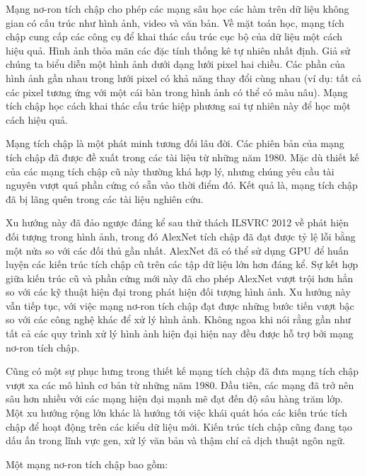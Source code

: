 \documentclass[../main.tex]{subfiles}
\begin{document}
Mạng nơ-ron tích chập cho phép các mạng sâu học các hàm trên dữ liệu không gian có cấu trúc như hình ảnh, video và văn bản. Về mặt toán học, mạng tích chập cung cấp các công cụ để khai thác cấu trúc cục bộ của dữ liệu một cách hiệu quả. Hình ảnh thỏa mãn các đặc tính thống kê tự nhiên nhất định. Giả sử chúng ta biểu diễn một hình ảnh dưới dạng lưới pixel hai chiều. Các phần của hình ảnh gần nhau trong lưới pixel có khả năng thay đổi cùng nhau (ví dụ: tất cả các pixel tương ứng với một cái bàn trong hình ảnh có thể có màu nâu). Mạng tích chập học cách khai thác cấu trúc hiệp phương sai tự nhiên này để học một cách hiệu quả.

Mạng tích chập là một phát minh tương đối lâu đời. Các phiên bản của mạng tích chập đã được đề xuất trong các tài liệu từ những năm 1980. Mặc dù thiết kế của các mạng tích chập cũ này thường khá hợp lý, nhưng chúng yêu cầu tài nguyên vượt quá phần cứng có sẵn vào thời điểm đó. Kết quả là, mạng tích chập đã bị lãng quên trong các tài liệu nghiên cứu.

Xu hướng này đã đảo ngược đáng kể sau thử thách ILSVRC 2012 về phát hiện đối tượng trong hình ảnh, trong đó AlexNet tích chập đã đạt được tỷ lệ lỗi bằng một nửa so với các đối thủ gần nhất. AlexNet đã có thể sử dụng GPU để huấn luyện các kiến trúc tích chập cũ trên các tập dữ liệu lớn hơn đáng kể. Sự kết hợp giữa kiến trúc cũ và phần cứng mới này đã cho phép AlexNet vượt trội hơn hẳn so với các kỹ thuật hiện đại trong phát hiện đối tượng hình ảnh. Xu hướng này vẫn tiếp tục, với việc mạng nơ-ron tích chập đạt được những bước tiến vượt bậc so với các công nghệ khác để xử lý hình ảnh. Không ngoa khi nói rằng gần như tất cả các quy trình xử lý hình ảnh hiện đại hiện nay đều được hỗ trợ bởi mạng nơ-ron tích chập.

Cũng có một sự phục hưng trong thiết kế mạng tích chập đã đưa mạng tích chập vượt xa các mô hình cơ bản từ những năm 1980. Đầu tiên, các mạng đã trở nên sâu hơn nhiều với các mạng hiện đại mạnh mẽ đạt đến độ sâu hàng trăm lớp. Một xu hướng rộng lớn khác là hướng tới việc khái quát hóa các kiến trúc tích chập để hoạt động trên các kiểu dữ liệu mới. Kiến trúc tích chập cũng đang tạo dấu ấn trong lĩnh vực gen, xử lý văn bản và thậm chí cả dịch thuật ngôn ngữ.

Một mạng nơ-ron tích chập bao gồm:
\end{document}
